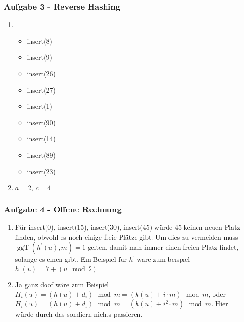 \documentclass[11pt]{scrartcl}
\newcommand{\task}[1]{\subsubsection*{#1}}
\begin{document}
\task{Aufgabe 3 - Reverse Hashing}
\begin{enumerate}[label=\alph*)]
	\item 
		\begin{itemize}
			\item insert(8)
			\item insert(9)
			\item insert(26)
			\item insert(27)
			\item insert(1)
			\item insert(90)
			\item insert(14)
			\item insert(89)
			\item insert(23)
		\end{itemize}
	\item $ a = 2 $, $ c = 4 $
\end{enumerate}

\task{Aufgabe 4 - Offene Rechnung}
\begin{enumerate}[label=\alph*)]
	\item 
		Für insert(0), insert(15), insert(30), insert(45) würde 45 keinen neuen Platz finden, obwohl es noch einige freie Plätze gibt.
		Um dies zu vermeiden muss $ \operatorname{ggT}(h^\prime(u), m) = 1 $ gelten, damit man immer einen freien Platz findet, solange es einen gibt.
		Ein Beispiel für $ h^\prime  $ wäre zum beispiel $ h^\prime (u) = 7 + ( u \mod 2) $
	\item Ja ganz doof wäre zum Beispiel
		$ H_i(u) = ( h(u) + d_i ) \mod m = ( h(u) + i \cdot m) \mod m $, oder
		$ H_i(u) = ( h(u) + d_i ) \mod m = ( h(u) + i^2 \cdot m) \mod m $.
		Hier würde durch das sondiern nichts passieren.
\end{enumerate}
\end{document}
